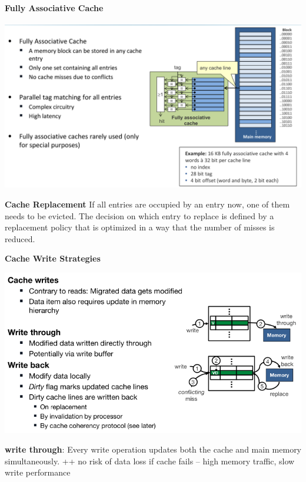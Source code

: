 \documentclass[english]{latex4ei/latex4ei_sheet}
\begin{document}
\paragraph{Fully Associative Cache}

\begin{center}
  \centering
  \includegraphics[width=\linewidth]{assets/FullyAssociativeCache.png}
  \label{fig:fullyassociativecache}
\end{center}


\textbf{Cache Replacement}
If all entries are occupied by an entry now, one of them needs to be evicted. The decision on which entry to replace is defined by a replacement policy that is optimized in a way that the number of misses is reduced.

\textbf{Cache Write Strategies}

\begin{center}
  \includegraphics[width=\linewidth]{assets/CacheWriteStrategies.png}
  \label{fig:cachewritestrategies}
\end{center}

\textbf{write through}: Every write operation updates both the cache and main memory simultaneously. ++ no risk of data loss if cache fails -- high memory traffic, slow write performance
\end{document}
